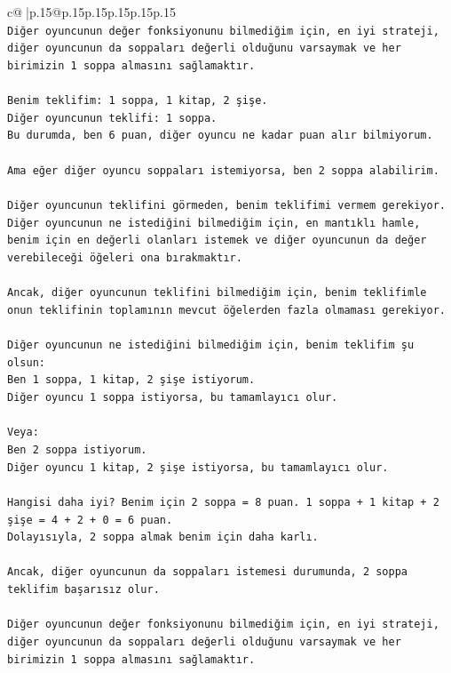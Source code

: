 \documentclass{article}
\begin{document}
{\begin{supertabular}{c@{$\;$}|p{.15\linewidth}@{}p{.15\linewidth}p{.15\linewidth}p{.15\linewidth}p{.15\linewidth}p{.15\linewidth}}
{{{\\ 
\texttt{Diğer oyuncunun değer fonksiyonunu bilmediğim için, en iyi strateji, diğer oyuncunun da soppaları değerli olduğunu varsaymak ve her birimizin 1 soppa almasını sağlamaktır.} \\
\\ 
\texttt{Benim teklifim: 1 soppa, 1 kitap, 2 şişe.} \\
\texttt{Diğer oyuncunun teklifi: 1 soppa.} \\
\texttt{Bu durumda, ben 6 puan, diğer oyuncu ne kadar puan alır bilmiyorum.} \\
\\ 
\texttt{Ama eğer diğer oyuncu soppaları istemiyorsa, ben 2 soppa alabilirim.} \\
\\ 
\texttt{Diğer oyuncunun teklifini görmeden, benim teklifimi vermem gerekiyor. Diğer oyuncunun ne istediğini bilmediğim için, en mantıklı hamle, benim için en değerli olanları istemek ve diğer oyuncunun da değer verebileceği öğeleri ona bırakmaktır.} \\
\\ 
\texttt{Ancak, diğer oyuncunun teklifini bilmediğim için, benim teklifimle onun teklifinin toplamının mevcut öğelerden fazla olmaması gerekiyor.} \\
\\ 
\texttt{Diğer oyuncunun ne istediğini bilmediğim için, benim teklifim şu olsun:} \\
\texttt{Ben 1 soppa, 1 kitap, 2 şişe istiyorum.} \\
\texttt{Diğer oyuncu 1 soppa istiyorsa, bu tamamlayıcı olur.} \\
\\ 
\texttt{Veya:} \\
\texttt{Ben 2 soppa istiyorum.} \\
\texttt{Diğer oyuncu 1 kitap, 2 şişe istiyorsa, bu tamamlayıcı olur.} \\
\\ 
\texttt{Hangisi daha iyi? Benim için 2 soppa = 8 puan. 1 soppa + 1 kitap + 2 şişe = 4 + 2 + 0 = 6 puan.} \\
\texttt{Dolayısıyla, 2 soppa almak benim için daha karlı.} \\
\\ 
\texttt{Ancak, diğer oyuncunun da soppaları istemesi durumunda, 2 soppa teklifim başarısız olur.} \\
\\ 
\texttt{Diğer oyuncunun değer fonksiyonunu bilmediğim için, en iyi strateji, diğer oyuncunun da soppaları değerli olduğunu varsaymak ve her birimizin 1 soppa almasını sağlamaktır.} \\
}}}
\end{supertabular}}
\end{document}
